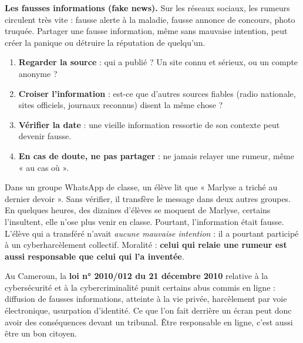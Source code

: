 \documentclass[11pt]{article}
\newcommand{\cle}[1]{{\popxbold\color{popdark}#1}}
\begin{document}
\textbf{Les fausses informations (fake news).} Sur les réseaux sociaux, les rumeurs circulent très vite : fausse alerte à la maladie, fausse annonce de concours, photo truquée. Partager une fausse information, même sans mauvaise intention, peut créer la panique ou détruire la réputation de quelqu'un.

\begin{methode}
\begin{enumerate}
\item \textbf{Regarder la source} : qui a publié ? Un site connu et sérieux, ou un compte anonyme ?
\item \textbf{Croiser l'information} : est-ce que d'autres sources fiables (radio nationale, sites officiels, journaux reconnus) disent la même chose ?
\item \textbf{Vérifier la date} : une vieille information ressortie de son contexte peut devenir fausse.
\item \textbf{En cas de doute, ne pas partager} : ne jamais relayer une rumeur, même « au cas où ».
\end{enumerate}
\end{methode}

\begin{exemplebox}
Dans un groupe WhatsApp de classe, un élève lit que « Marlyse a triché au dernier devoir ». Sans vérifier, il transfère le message dans deux autres groupes. En quelques heures, des dizaines d'élèves se moquent de Marlyse, certains l'insultent, elle n'ose plus venir en classe. Pourtant, l'information était fausse. L'élève qui a transféré n'avait \emph{aucune mauvaise intention} : il a pourtant participé à un \cle{cyberharcèlement} collectif. Moralité : \textbf{celui qui relaie une rumeur est aussi responsable que celui qui l'a inventée}.
\end{exemplebox}

\begin{savaistu}
Au Cameroun, la \textbf{loi n° 2010/012 du 21 décembre 2010} relative à la cybersécurité et à la cybercriminalité punit certains abus commis en ligne : diffusion de fausses informations, atteinte à la vie privée, harcèlement par voie électronique, usurpation d'identité. Ce que l'on fait derrière un écran peut donc avoir des conséquences devant un tribunal. Être responsable en ligne, c'est aussi être un bon citoyen.
\end{savaistu}
\end{document}
